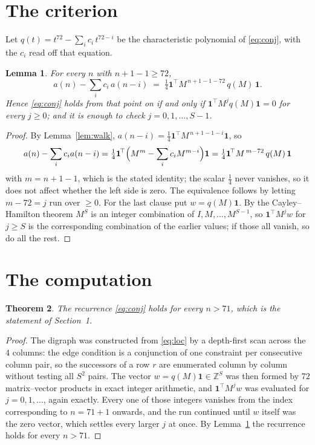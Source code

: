 \documentclass[11pt,a4paper]{article}
\theoremstyle{plain}
\newtheorem{theorem}{Theorem}
\newtheorem{lemma}[theorem]{Lemma}
\theoremstyle{definition}
\begin{document}
\section{The criterion}

Let $q(t)=t^{72}-\sum_i c_i\,t^{72-i}$ be the characteristic polynomial of
\eqref{eq:conj}, with the $c_i$ read off that equation.

\begin{lemma}\label{lem:crit}
For every $n$ with $n+1-1\ge72$,
\[
a(n)-\sum_i c_i\,a(n-i)\;=\;\tfrac1{4}\mathbf{1}^{\!\top}M^{\,n+1-1-72}\,q(M)\,\mathbf{1} .
\]
Hence \eqref{eq:conj} holds from that point on if and only if
$\mathbf{1}^{\!\top}M^{j}q(M)\mathbf{1}=0$ for every $j\ge0$; and it is enough to check
$j=0,1,\dots,S-1$.
\end{lemma}

\begin{proof}
By Lemma~\ref{lem:walk}, $a(n-i)=\tfrac1{4}\mathbf{1}^{\!\top}M^{\,n+1-1-i}\mathbf{1}$, so
\[
a(n)-\sum_i c_i a(n-i)
=\tfrac1{4}\mathbf{1}^{\!\top}\Bigl(M^{m}-\sum_i c_i M^{m-i}\Bigr)\mathbf{1}
=\tfrac1{4}\mathbf{1}^{\!\top}M^{\,m-72}\,q(M)\,\mathbf{1}
\]
with $m=n+1-1$, which is the stated identity; the scalar $\tfrac1{4}$ never vanishes, so
it does not affect whether the left side is zero. The equivalence follows by letting
$m-72=j$ run over $\ge0$. For the last clause put $w=q(M)\mathbf{1}$. By the
Cayley--Hamilton theorem $M^{S}$ is an integer combination of $I,M,\dots,M^{S-1}$, so
$\mathbf{1}^{\!\top}M^{j}w$ for $j\ge S$ is the corresponding combination of the earlier
values; if those all vanish, so do all the rest.
\end{proof}

\section{The computation}

\begin{theorem}
The recurrence \eqref{eq:conj} holds for every $n>71$, which is the statement of
Section~1.
\end{theorem}

\begin{proof}
The digraph was constructed from \eqref{eq:loc} by a depth-first scan across the $4$
columns: the edge condition is a conjunction of one constraint per consecutive column
pair, so the successors of a row $r$ are enumerated column by column without testing all
$S^2$ pairs. The vector $w=q(M)\mathbf{1}\in\mathbb{Z}^{S}$ was then formed by $72$
matrix--vector products in exact integer arithmetic, and $\mathbf{1}^{\!\top}M^{j}w$ was
evaluated for $j=0,1,\dots$, again exactly. Every one of those integers vanishes from the
index corresponding to $n=71+1$ onwards, and the run continued until $w$ itself was the
zero vector, which settles every larger $j$ at once. By Lemma~\ref{lem:crit} the recurrence
holds for every $n>71$.
\end{proof}
\end{document}
